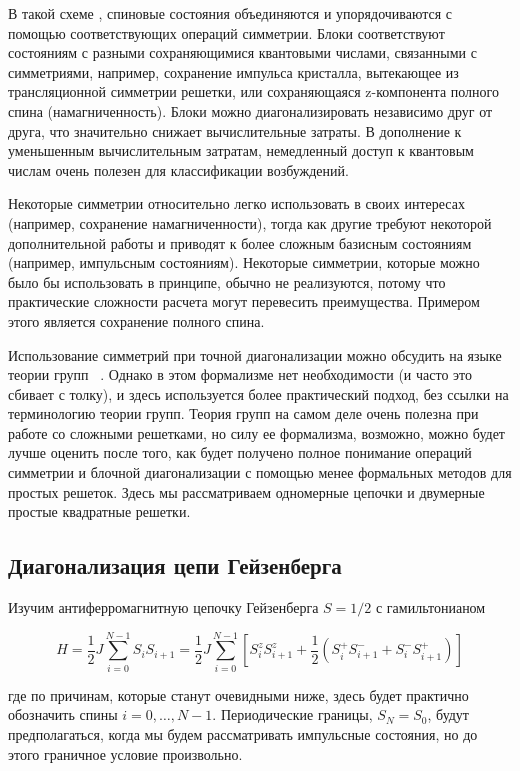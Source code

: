 \documentclass[11pt]{article}
\begin{document}
В такой схеме , спиновые состояния объединяются и упорядочиваются с помощью соответствующих операций симметрии. Блоки соответствуют состояниям с разными сохраняющимися квантовыми числами, связанными с симметриями, например, сохранение импульса кристалла, вытекающее из трансляционной симметрии решетки, или сохраняющаяся z-компонента полного спина (намагниченность). Блоки можно диагонализировать независимо друг от друга, что значительно снижает вычислительные затраты. В дополнение к уменьшенным вычислительным затратам, немедленный доступ к квантовым числам очень полезен для классификации возбуждений.

Некоторые симметрии относительно легко использовать в своих интересах (например, сохранение намагниченности), тогда как другие требуют некоторой дополнительной работы и приводят к более сложным базисным состояниям (например, импульсным состояниям). Некоторые симметрии, которые можно было бы использовать в принципе, обычно не реализуются, потому что практические сложности расчета могут перевесить преимущества. Примером этого является сохранение полного спина.

Использование симметрий при точной диагонализации можно обсудить на языке теории групп ~\cite{lnp_645_227}. Однако в этом формализме нет необходимости (и часто это сбивает с толку), и здесь используется более практический подход, без ссылки на терминологию теории групп. Теория групп на самом деле очень полезна при работе со сложными решетками, но силу ее формализма, возможно, можно будет лучше оценить после того, как будет получено полное понимание операций симметрии и блочной диагонализации с помощью менее формальных методов для простых решеток. Здесь мы рассматриваем одномерные цепочки и двумерные простые квадратные решетки.

\subsection{Диагонализация цепи Гейзенберга}
Изучим антиферромагнитную цепочку Гейзенберга $S = 1/2$ с гамильтонианом

\begin{equation}
H=\frac{1}{2}J\sum\limits_{i=0}^{N-1}S_iS_{i+1}=\frac{1}{2}J\sum\limits_{i=0}^{N-1}[S_i^zS_{i+1}^z+\frac{1}{2}(S_i^{+}S_{i+1}^{-} + S_i^{-}S_{i+1}^{+})]
\label{eq_106}
\end{equation}

где по причинам, которые станут очевидными ниже, здесь будет практично обозначить спины $i = 0, \dots , N - 1$. Периодические границы, $S_N = S_0$, будут предполагаться, когда мы будем рассматривать импульсные состояния, но до этого граничное условие произвольно.
\end{document}
